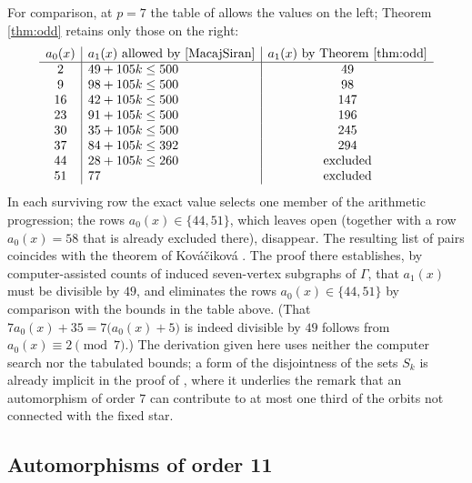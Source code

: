 \documentclass[11pt]{article}
\theoremstyle{plain}
\theoremstyle{remark}
\begin{document}
For comparison, at $p=7$ the table of \cite[Lemma 12]{MacajSiran} allows the values on the left;
Theorem \ref{thm:odd} retains only those on the right:
\[
\begin{array}{c|l|c}
 a_0(x) & a_1(x)\ \text{allowed by \cite[Lemma 12]{MacajSiran}} & a_1(x)\ \text{by Theorem \ref{thm:odd}} \\
\hline
 2 & 49+105k\le 500 & 49 \\
 9 & 98+105k\le 500 & 98 \\
 16 & 42+105k\le 500 & 147 \\
 23 & 91+105k\le 500 & 196 \\
 30 & 35+105k\le 500 & 245 \\
 37 & 84+105k\le 392 & 294 \\
 44 & 28+105k\le 260 & \text{excluded} \\
 51 & 77 & \text{excluded}
\end{array}
\]
In each surviving row the exact value selects one member of the arithmetic progression; the rows $a_0(x)\in\{44,51\}$,
which \cite[Lemma 12]{MacajSiran} leaves open (together with a row $a_0(x)=58$ that is already excluded there), disappear.
The resulting list of pairs coincides with the theorem of Kov\'a\v{c}ikov\'a \cite[Theorem 5.1]{Kovacikova}.
The proof there establishes, by computer-assisted counts of induced seven-vertex subgraphs of $\Gamma$,
that $a_1(x)$ must be divisible by $49$,
and eliminates the rows $a_0(x)\in\{44,51\}$ by comparison with the bounds in the table above.
(That $7a_0(x)+35=7\bigl(a_0(x)+5\bigr)$ is indeed divisible by $49$ follows from $a_0(x)\equiv 2\pmod 7$.)  The
derivation given here uses neither the computer search nor the tabulated bounds;
a form of the disjointness of the sets $S_k$ is already implicit in the proof of \cite[Lemma 12]{MacajSiran},
where it underlies the remark that an automorphism of order $7$ can contribute to at most one third of the orbits not connected with the fixed star.


\subsection{Automorphisms of order 11}\label{subsec:order11}
\end{document}
